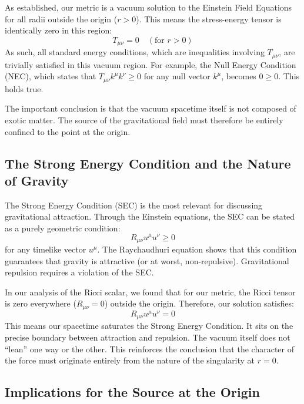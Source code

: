 \documentclass[%
  reprint,
  superscriptaddress,
  showpacs,
  showkeys,
  amsmath,amssymb,
  pra,
  longbibliography,
  floatfix,
]{revtex4-2}
\begin{document}
As established, our metric is a vacuum solution to the Einstein Field Equations for all radii outside the origin ($r>0$). This means the stress-energy tensor is identically zero in this region:
\begin{equation}
    T_{\mu\nu} = 0 \quad (\text{for } r > 0)
\end{equation}
As such, all standard energy conditions, which are inequalities involving $T_{\mu\nu}$, are trivially satisfied in this vacuum region. For example, the Null Energy Condition (NEC), which states that $T_{\mu\nu}k^\mu k^\nu \ge 0$ for any null vector $k^\mu$, becomes $0 \ge 0$. This holds true.

The important conclusion is that the vacuum spacetime itself is not composed of exotic matter. The source of the gravitational field must therefore be entirely confined to the point at the origin.

\subsection{The Strong Energy Condition and the Nature of Gravity}

The Strong Energy Condition (SEC) is the most relevant for discussing gravitational attraction. Through the Einstein equations, the SEC can be stated as a purely geometric condition:
\begin{equation}
    R_{\mu\nu}u^\mu u^\nu \ge 0
\end{equation}
for any timelike vector $u^\mu$. The Raychaudhuri equation shows that this condition guarantees that gravity is attractive (or at worst, non-repulsive). Gravitational repulsion requires a violation of the SEC.

In our analysis of the Ricci scalar, we found that for our metric, the Ricci tensor is zero everywhere ($R_{\mu\nu}=0$) outside the origin. Therefore, our solution satisfies:
\begin{equation}
    R_{\mu\nu}u^\mu u^\nu = 0
\end{equation}
This means our spacetime {saturates the Strong Energy Condition}. It sits on the precise boundary between attraction and repulsion. The vacuum itself does not ``lean'' one way or the other. This reinforces the conclusion that the character of the force must originate entirely from the nature of the singularity at $r=0$.

\subsection{Implications for the Source at the Origin}
\end{document}
